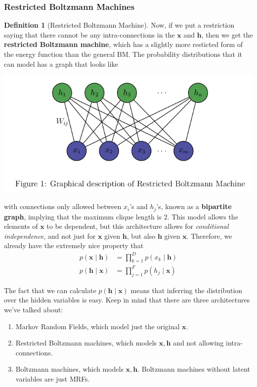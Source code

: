 \documentclass{article}
\theoremstyle{definition}
\theoremstyle{remark}
\theoremstyle{definition}
\newtheorem{definition}{Definition}[section]
\begin{document}
    \subsubsection{Restricted Boltzmann Machines} 

      \begin{definition}[Restricted Boltzmann Machine] 
        Now, if we put a restriction saying that there cannot be any intra-connections in the $\mathbf{x}$ and $\mathbf{h}$, then we get the \textbf{restricted Boltzmann machine}, which has a slightly more resticted form of the energy function than the general BM. The probability distributions that it can model has a graph that looks like 
        \begin{center}
          \includegraphics[scale=0.4]{Images/rbm_layer.png}
        \end{center}
        with connections only allowed between $x_i$'s and $h_j$'s, known as a \textbf{bipartite graph}, implying that the maximum clique length is $2$. This model allows the elements of $\mathbf{x}$ to be dependent, but this architecture allows for \textit{conditional independence}, and not just for $\mathbf{x}$ given $\mathbf{h}$, but also $\mathbf{h}$ given $\mathbf{x}$. Therefore, we already have the extremely nice property that 
        \begin{align*} 
          p(\mathbf{x} \mid \mathbf{h}) & = \prod_{k=1}^{D} p(x_k \mid \mathbf{h}) \\
          p(\mathbf{h} \mid \mathbf{x}) & = \prod_{j=1}^F p(h_j \mid \mathbf{x}) 
        \end{align*}
      \end{definition}

      The fact that we can calculate $p(\mathbf{h} \mid \mathbf{x})$ means that inferring the distribution over the hidden variables is easy. Keep in mind that there are three architectures we've talked about: 
      \begin{enumerate}
        \item Markov Random Fields, which model just the original $\mathbf{x}$. 
        \item Restricted Boltzmann machines, which models $\mathbf{x}, \mathbf{h}$ and not allowing intra-connections. 
        \item Boltzmann machines, which models $\mathbf{x}, \mathbf{h}$. Boltzmann machines without latent variables are just MRFs.  
      \end{enumerate}
\end{document}
